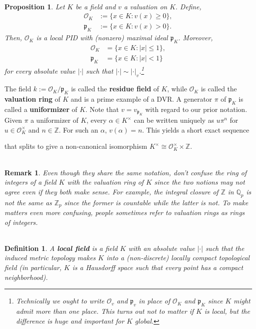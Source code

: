 \documentclass[11pt]{article}
\newcommand{\Q}{\mathbb{Q}}
\newcommand{\Z}{\mathbb{Z}}
\newcommand{\abs}[1]{\left\lvert#1\right\rvert}
\newcommand{\iso}{\cong}
\newcommand{\mc}[1]{\mathcal{#1}}
\newcommand{\mf}[1]{\mathfrak{#1}}
\renewcommand{\O}{\mc{O}}
\newtheorem*{definition*}{\\Definition}
\newtheorem*{proposition*}{\\Proposition}
\newtheorem*{remark*}{\\Remark}
\begin{document}
\begin{proposition*}
Let $K$ be a field and $v$ a valuation on $K$. Define,
\begin{align*}
\O_K&:=\{x\in K : v(x)\geq0\}, \\
\mf{p}_K&:=\{x\in K : v(x)>0\}.
\end{align*}
Then, $\O_K$ is a local PID with (nonzero) maximal ideal $\mf{p}_K$. Moreover,
\begin{align*}
\O_K&=\{x\in K : |x|\leq1\}, \\
\mf{p}_K&=\{x\in K : |x|<1\}
\end{align*}
for every absolute value $\abs{\cdot}$ such that $\abs{\cdot}\sim\abs{\cdot}_v$.\footnote{Technically we ought to write $\O_v$ and $\mf{p}_v$ in place of $\O_K$ and $\mf{p}_K$ since $K$ might admit more than one place. This turns out not to matter if $K$ is local, but the difference is huge and important for $K$ global.}
\end{proposition*}

The field $k:=\O_K/\mf{p}_K$ is called the \textbf{residue field} of $K$, while $\O_K$ is called the \textbf{valuation ring} of $K$ and is a prime example of a DVR. A generator $\pi$ of $\mf{p}_K$ is called a \textbf{uniformizer} of $K$. Note that $v=v_{\mf{p}_K}$ with regard to our prior notation. Given $\pi$ a uniformizer of $K$, every $\alpha\in K^{\times}$ can be written uniquely as $u\pi^n$ for $u\in\O_K^{\times}$ and $n\in\Z$. For such an $\alpha$, $v(\alpha)=n$. This yields a short exact sequence 
\begin{center}
\end{center}
that splits to give a non-canonical isomorphism $K^{\times}\iso\O_K^{\times}\times\Z$.

\begin{remark*}
Even though they share the same notation, don't confuse the ring of integers of a field $K$ with the valuation ring of $K$ since the two notions may not agree even if they both make sense. For example, the integral closure of $\Z$ in $\Q_p$ is not the same as $\Z_p$ since the former is countable while the latter is not. To make matters even more confusing, people sometimes refer to valuation rings as rings of integers.
\end{remark*}

\begin{definition*}
A \textbf{local field} is a field $K$ with an absolute value $\abs{\cdot}$ such that the induced metric topology makes $K$ into a (non-discrete) locally compact topological field (in particular, $K$ is a Hausdorff space such that every point has a compact neighborhood). 
\end{definition*}
\end{document}
